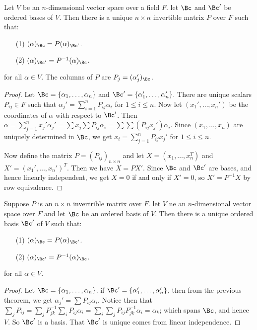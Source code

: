 \begin{theorem}\label{2.6.1}
    Let $V$ be an $n$-dimensional vector space over a field $F$. let $\Bc$ and  $\Bc'$ be ordered
    bases of  $V$. Then there is a unique $n \times n$ invertible matrix  $P$ over  $F$ such that:
     \begin{enumerate}
         \item[(1)] $(\alpha)_{\Bc}=P(\alpha)_{\Bc'}$.

         \item[(2)] $(\alpha)_{\Bc'}=P^{-1}(\alpha)_{\Bc}$.
    \end{enumerate}
    for all $\alpha \in V$. The columns of $P$ are $P_j=(\alpha'_j)_{\Bc}$.
\end{theorem}
\begin{proof}
    Let $\Bc=\{\alpha_1, \dots, \alpha_n\}$ and $\Bc'=\{\alpha'_1, \dots, \alpha'_n\}$. There are
    unique scalars $P_{ij} \in F$ such that $\alpha_j'=\sum_{i=1}^n{P_{ij}\alpha_i}$ for $1 \leq i
    \leq n$. Now let  $(x_1', \dots, x_n')$ be the coordinates of  $\alpha$ with respect to  $\Bc'$.
    Then
    $\alpha=\sum_{j=1}^n{x_j'\alpha_j'}=\sum{x_j}\sum{P_{ij}\alpha_i}=\sum{\sum{(P_{ij}x_j')\alpha_i}}$.
    Since $(x_1, \dots, x_n)$ are uniquely determined in $\Bc$, we get
    $x_i=\sum_{j=1}^n{P_{ij}x_j'}$ for $1 \leq i \leq n$.

    Now define the matrix  $P=(P_{ij})_{n \times n}$ and let $X=(x_1, \dots, x_n^T)$ and $X'=(x_1',
    \dots, x_n')^T$. Then we have $X=PX'$. Since  $\Bc$ and  $\Bc'$ are bases, and hence linearly
    independent, we get  $X=0$ if and only if  $X'=0$, so  $X'=P^{-1}X$ by row equivalence.
\end{proof}

\begin{theorem}\label{2.6.8}
    Suppose $P$ is an  $n \times n$ invertrible matrix over  $F$. let  $V$ ne an  $n$-dimensional
    vector space over  $F$ and let  $\Bc$ be an ordered basis of  $V$. Then there is a unique
    ordered basis  $\Bc'$ of  $V$ such that:\
     \begin{enumerate}
         \item[(1)] $(\alpha)_{\Bc}=P(\alpha)_{\Bc'}$.

         \item[(2)] $(\alpha)_{\Bc'}=P^{-1}(\alpha)_{\Bc}$.
    \end{enumerate}

    for all $\alpha \in V$.
\end{theorem}
\begin{proof}
    Let $\Bc=\{\alpha_1, \dots, \alpha_n\}$. if $\Bc'=\{\alpha_1', \dots, \alpha_n'\}$,
    then from the previous theorem, we get $\alpha_j'=\sum{P_{ij}\alpha_i}$. Notice
    then that
    $\sum_{j}{P_{ij}}=\sum_{j}{P^{-1}_{jk}}\sum_{i}{P_{ij}\alpha_i}=\sum_{i}{\sum_{j}{P_{ij}P^{-1}_{jk}}\alpha_i}=\alpha_k$;
    which spans $\Bc$, and hence  $V$. So   $\Bc'$ is a basis. That  $\Bc'$ is unique comes from
    linear independence.
\end{proof}

